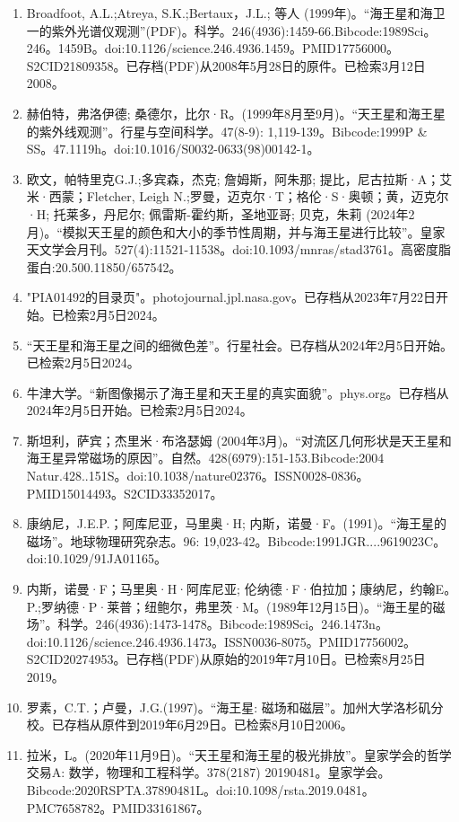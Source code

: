 \begin{enumerate}
\item Broadfoot, A.L.;Atreya, S.K.;Bertaux，J.L.; 等人 (1999年)。“海王星和海卫一的紫外光谱仪观测”(PDF)。科学。246(4936):1459-66.Bibcode:1989Sci。246。1459B。doi:10.1126/science.246.4936.1459。PMID17756000。S2CID21809358。已存档(PDF)从2008年5月28日的原件。已检索3月12日2008。   
\item 赫伯特，弗洛伊德; 桑德尔，比尔·R。(1999年8月至9月)。“天王星和海王星的紫外线观测”。行星与空间科学。47(8-9): 1,119-139。Bibcode:1999P & SS。47.1119h。doi:10.1016/S0032-0633(98)00142-1。
\item 欧文，帕特里克G.J.;多宾森，杰克; 詹姆斯，阿朱那; 提比，尼古拉斯·A；艾米·西蒙；Fletcher, Leigh N.;罗曼，迈克尔·T；格伦·S·奥顿；黄，迈克尔·H; 托莱多，丹尼尔; 佩雷斯-霍约斯，圣地亚哥; 贝克，朱莉 (2024年2月)。“模拟天王星的颜色和大小的季节性周期，并与海王星进行比较”。皇家天文学会月刊。527(4):11521-11538。doi:10.1093/mnras/stad3761。高密度脂蛋白:20.500.11850/657542。
\item "PIA01492的目录页"。photojournal.jpl.nasa.gov。已存档从2023年7月22日开始。已检索2月5日2024。
\item “天王星和海王星之间的细微色差”。行星社会。已存档从2024年2月5日开始。已检索2月5日2024。
\item 牛津大学。“新图像揭示了海王星和天王星的真实面貌”。phys.org。已存档从2024年2月5日开始。已检索2月5日2024。
\item 斯坦利，萨宾；杰里米·布洛瑟姆 (2004年3月)。“对流区几何形状是天王星和海王星异常磁场的原因”。自然。428(6979):151-153.Bibcode:2004 Natur.428..151S。doi:10.1038/nature02376。ISSN0028-0836。PMID15014493。S2CID33352017。   
\item 康纳尼，J.E.P.；阿库尼亚，马里奥·H; 内斯，诺曼·F。(1991)。“海王星的磁场”。地球物理研究杂志。96: 19,023-42。Bibcode:1991JGR....9619023C。doi:10.1029/91JA01165。
\item 内斯，诺曼·F；马里奥·H·阿库尼亚; 伦纳德·F·伯拉加；康纳尼，约翰E。P.;罗纳德·P·莱普；纽鲍尔，弗里茨·M。(1989年12月15日)。“海王星的磁场”。科学。246(4936):1473-1478。Bibcode:1989Sci。246.1473n。doi:10.1126/science.246.4936.1473。ISSN0036-8075。PMID17756002。S2CID20274953。已存档(PDF)从原始的2019年7月10日。已检索8月25日2019。   
\item 罗素，C.T.；卢曼，J.G.(1997)。“海王星: 磁场和磁层”。加州大学洛杉矶分校。已存档从原件到2019年6月29日。已检索8月10日2006。
\item 拉米，L。(2020年11月9日)。“天王星和海王星的极光排放”。皇家学会的哲学交易A: 数学，物理和工程科学。378(2187) 20190481。皇家学会。Bibcode:2020RSPTA.37890481L。doi:10.1098/rsta.2019.0481。PMC7658782。PMID33161867。  

\end{enumerate}
